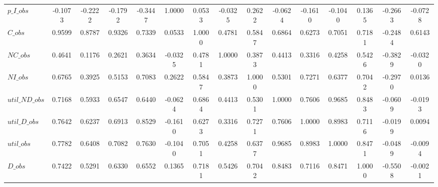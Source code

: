 \begin{center}
\begin{longtable}{lcccccccccccccc}
$p\_I\_obs      $	 & 	          -0.1073	 & 	          -0.2222	 & 	          -0.1792	 & 	          -0.3447	 & 	           1.0000	 & 	           0.0533	 & 	          -0.0325	 & 	           0.2622	 & 	          -0.0624	 & 	          -0.1610	 & 	          -0.1040	 & 	           0.1365	 & 	          -0.2663	 & 	          -0.0728 \\ 
$C\_obs         $	 & 	           0.9599	 & 	           0.8787	 & 	           0.9326	 & 	           0.7339	 & 	           0.0533	 & 	           1.0000	 & 	           0.4781	 & 	           0.5847	 & 	           0.6864	 & 	           0.6273	 & 	           0.7051	 & 	           0.7181	 & 	          -0.2484	 & 	           0.6143 \\ 
$NC\_obs        $	 & 	           0.4641	 & 	           0.1176	 & 	           0.2621	 & 	           0.3634	 & 	          -0.0325	 & 	           0.4781	 & 	           1.0000	 & 	           0.3873	 & 	           0.4413	 & 	           0.3316	 & 	           0.4258	 & 	           0.5426	 & 	          -0.3829	 & 	          -0.0320 \\ 
$NI\_obs        $	 & 	           0.6765	 & 	           0.3925	 & 	           0.5153	 & 	           0.7083	 & 	           0.2622	 & 	           0.5847	 & 	           0.3873	 & 	           1.0000	 & 	           0.5301	 & 	           0.7271	 & 	           0.6377	 & 	           0.7042	 & 	          -0.2970	 & 	           0.0136 \\ 
$util\_ND\_obs  $	 & 	           0.7168	 & 	           0.5933	 & 	           0.6547	 & 	           0.6440	 & 	          -0.0624	 & 	           0.6864	 & 	           0.4413	 & 	           0.5301	 & 	           1.0000	 & 	           0.7606	 & 	           0.9685	 & 	           0.8483	 & 	          -0.0609	 & 	          -0.0193 \\ 
$util\_D\_obs   $	 & 	           0.7642	 & 	           0.6237	 & 	           0.6913	 & 	           0.8529	 & 	          -0.1610	 & 	           0.6273	 & 	           0.3316	 & 	           0.7271	 & 	           0.7606	 & 	           1.0000	 & 	           0.8983	 & 	           0.7116	 & 	          -0.0199	 & 	           0.0094 \\ 
$util\_obs      $	 & 	           0.7782	 & 	           0.6408	 & 	           0.7082	 & 	           0.7630	 & 	          -0.1040	 & 	           0.7051	 & 	           0.4258	 & 	           0.6377	 & 	           0.9685	 & 	           0.8983	 & 	           1.0000	 & 	           0.8471	 & 	          -0.0489	 & 	          -0.0094 \\ 
$D\_obs         $	 & 	           0.7422	 & 	           0.5291	 & 	           0.6330	 & 	           0.6552	 & 	           0.1365	 & 	           0.7181	 & 	           0.5426	 & 	           0.7042	 & 	           0.8483	 & 	           0.7116	 & 	           0.8471	 & 	           1.0000	 & 	          -0.5508	 & 	          -0.0021 \\ 

\end{longtable}
\end{center}
